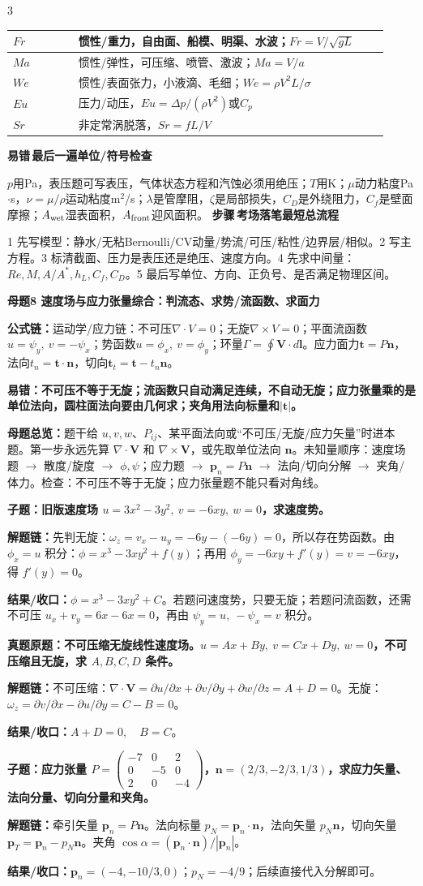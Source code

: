 \documentclass[a4paper]{article}
\newcommand{\mt}[1]{\vspace{0.12pt}\colorbox{M}{\parbox{\dimexpr\linewidth-2\fboxsep}{\color{white}\bfseries #1}}\par}
\newcommand{\qt}[1]{\vspace{0.04pt}\colorbox{Q}{\parbox{\dimexpr\linewidth-2\fboxsep}{\color{white}\bfseries #1}}\par}
\newcommand{\ans}[1]{\colorbox{G}{\parbox{\dimexpr\linewidth-2\fboxsep}{#1}}\par}
\newcommand{\warn}[1]{\colorbox{Y}{\parbox{\dimexpr\linewidth-2\fboxsep}{\color{E}\bfseries #1}}\par}
\newcommand{\chain}[1]{{\color{A}\bfseries 解题链：}#1\par}
\newcommand{\res}[1]{{\color{E}\bfseries 结果/收口：}#1\par}
\newcommand{\form}[1]{{\color{M}\bfseries 公式链：}#1\par}
\newcommand{\labtag}[3]{{\bfseries\color{#1}\colorbox{#1}{\color{white}\fontsize{2.18}{2.28}\selectfont #2}\,#3}\par}
\newcommand{\step}[1]{\labtag{S}{步骤}{#1}}
\newcommand{\err}[1]{\labtag{R}{易错}{#1}}
\newcommand{\mview}[1]{\ans{\textbf{母题总览：}#1}}
\newcommand{\stepq}[1]{\step{#1}}
\newcommand{\errq}[1]{\err{#1}}
\newenvironment{vfourWrap}{\par\begingroup\fontsize{2.56}{2.70}\selectfont\setlength{\fboxsep}{0.38pt}}{\par\endgroup}
\begin{document}
\begin{multicols}{3}
\begin{vfourWrap}
\begin{tabular}{|p{0.16\linewidth}|p{0.76\linewidth}|}
$Fr$ & 惯性/重力，自由面、船模、明渠、水波；$Fr=V/\sqrt{gL}$\\ \hline
$Ma$ & 惯性/弹性，可压缩、喷管、激波；$Ma=V/a$\\ \hline
$We$ & 惯性/表面张力，小液滴、毛细；$We=\rho V^2L/\sigma$\\ \hline
$Eu$ & 压力/动压，$Eu=\Delta p/(\rho V^2)$或$C_p$\\ \hline
$Sr$ & 非定常涡脱落，$Sr=fL/V$\\ \hline
\end{tabular}
\errq{最后一遍单位/符号检查}
$p$用Pa，表压题可写表压，气体状态方程和汽蚀必须用绝压；$T$用K；$\mu$动力粘度Pa$\cdot$s，$\nu=\mu/\rho$运动粘度m$^2$/s；$\lambda$是管摩阻，$\zeta$是局部损失，$C_D$是外绕阻力，$C_f$是壁面摩擦；$A_{\rm wet}$湿表面积，$A_{\rm front}$迎风面积。
\stepq{考场落笔最短总流程}
1 先写模型：静水/无粘Bernoulli/CV动量/势流/可压/粘性/边界层/相似。2 写主方程。3 标清截面、压力是表压还是绝压、速度方向。4 先求中间量：$Re,M,A/A^*,h_L,C_f,C_D$。5 最后写单位、方向、正负号、是否满足物理区间。
\end{vfourWrap}
\mt{母题8 速度场与应力张量综合：判流态、求势/流函数、求面力}
\form{运动学/应力链：不可压$\nabla\cdot V=0$；无旋$\nabla\times V=0$；平面流函数$u=\psi_y,\ v=-\psi_x$；势函数$u=\phi_x,\ v=\phi_y$；环量$\Gamma=\oint\bm V\cdot d\bm l$。应力面力$\bm t=P\bm n$，法向$t_n=\bm t\cdot\bm n$，切向$\bm t_t=\bm t-t_n\bm n$。}
\warn{易错：不可压不等于无旋；流函数只自动满足连续，不自动无旋；应力张量乘的是单位法向，圆柱面法向要由几何求；夹角用法向标量和$|\bm t|$。}
\mview{题干给 $u,v,w$、$P_{ij}$、某平面法向或“不可压/无旋/应力矢量”时进本题。第一步永远先算 $\nabla\cdot\bm V$ 和 $\nabla\times\bm V$，或先取单位法向 $\bm n$。未知量顺序：速度场题 $\to$ 散度/旋度 $\to$ $\phi,\psi$；应力题 $\to$ $\bm p_n=P\bm n$ $\to$ 法向/切向分解 $\to$ 夹角/体力。检查：不可压不等于无旋；应力张量题不能只看对角线。}
\qt{子题：旧版速度场 $u=3x^2-3y^2,\ v=-6xy,\ w=0$，求速度势。}
\chain{先判无旋：$\omega_z=v_x-u_y=-6y-(-6y)=0$，所以存在势函数。由 $\phi_x=u$ 积分：$\phi=x^3-3xy^2+f(y)$；再用 $\phi_y=-6xy+f'(y)=v=-6xy$，得 $f'(y)=0$。}
\res{$\phi=x^3-3xy^2+C$。若题问速度势，只要无旋；若题问流函数，还需不可压 $u_x+v_y=6x-6x=0$，再由 $\psi_y=u,\ -\psi_x=v$ 积分。}
\qt{真题原题：不可压缩无旋线性速度场。$u=Ax+By,\ v=Cx+Dy,\ w=0$，不可压缩且无旋，求 $A,B,C,D$ 条件。}
\chain{不可压缩：$\nabla\cdot\bm V=\partial u/\partial x+\partial v/\partial y+\partial w/\partial z=A+D=0$。无旋：$\omega_z=\partial v/\partial x-\partial u/\partial y=C-B=0$。}
\res{$A+D=0,\quad B=C$。}

\qt{子题：应力张量 $P=\begin{pmatrix}-7&0&2\\0&-5&0\\2&0&-4\end{pmatrix}$，$\bm n=(2/3,-2/3,1/3)$，求应力矢量、法向分量、切向分量和夹角。}
\chain{牵引矢量 $\bm p_n=P\bm n$。法向标量 $p_N=\bm p_n\cdot\bm n$，法向矢量 $p_N\bm n$，切向矢量 $\bm p_T=\bm p_n-p_N\bm n$。夹角 $\cos\alpha=(\bm p_n\cdot\bm n)/|\bm p_n|$。}
\res{$\bm p_n=(-4,-10/3,0)$；$p_N=-4/9$；后续直接代入分解即可。}


\end{multicols}
\end{document}
